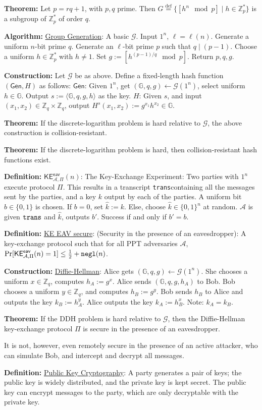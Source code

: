 \documentclass[10pt]{article}
\newcommand{\Z}{\mathbb{Z}}
\newcommand{\G}{\mathbb{G}}
\newcommand{\AAA}{\mathcal{A}}
\newcommand{\GGG}{\mathcal{G}}
\newcommand{\defn}[1]{{\bf Definition:} \underline{#1}}
\newcommand{\thm}[1]{{\bf Theorem:} \underline{#1}}
\newcommand{\con}[1]{{\bf Construction:} \underline{#1}}
\newcommand{\alg}[1]{{\bf Algorithm:} \underline{#1}}
\newcommand{\Gen}{\mathsf{Gen}}
\newcommand{\ang}[1]{\langle#1\rangle}
\newcommand{\ExptKEArgs}[2]{\mathsf{KE}^{\mathsf{eav}}_{#1,#2}}
\newcommand{\ExptKE}{\ExptKEArgs{\AAA}{\Pi}}
\newcommand{\negl}{{\tt negl}}
\newcommand{\trans}{{\tt trans}}
\newcommand{\from}{\leftarrow}
\begin{document}
\begin{multicols}{3}
\thm{}Let $p=rq+1$, with $p,q$ prime. Then $G\overset{\text{def}}{=}\{[h^n\mod{p}]\mid h\in\Z^*_p\}$ is a subgroup of $\Z^*_p$ of order $q$.

\alg{Group Generation}: A basic $\GGG$. Input $1^n$, $\ell=\ell(n)$. Generate a uniform $n$-bit prime $q$. Generate an $\ell$-bit prime $p$ such that $q\mid (p-1)$. Choose a uniform $h\in\Z_p^*$ with $h\neq 1$. Set $g:=[h^{(p-1)/q}\mod{p}]$. Return $p,q,g$.

\con{}Let $\GGG$ be as above. Define a fixed-length hash function $(\Gen,H)$ as follows: $\Gen$: Given $1^n$, get $(\G,q,g)\from\GGG(1^n)$, select uniform $h\in\G$. Output $s:=\ang{\G,q,g,h}$ as the key. $H$: Given $s$, and input $(x_1,x_2)\in\Z_q\times\Z_q$, output $H^s(x_1,x_2):=g^{x_1}h^{x_2}\in\G$.

\thm{}If the discrete-logarithm problem is hard relative to $\GGG$, the above construction is collision-resistant.

\thm{}If the discrete-logarithm problem is hard, then collision-resistant hash functions exist.

\defn{$\ExptKE(n)$}: The Key-Exchange Experiment: Two parties with $1^n$ execute protocol $\Pi$. This results in a transcript \trans containing all the messages sent by the parties, and a key $k$ output by each of the parties. A uniform bit $b\in\{0,1\}$ is chosen. If $b=0$, set $\hat{k}:=k$. Else, choose $\hat{k}\in\{0,1\}^n$ at random. $\AAA$ is given $\trans$ and $\hat{k}$, outputs $b'$. Success if and only if $b'=b$.

\defn{KE EAV secure}: (Security in the presence of an eavesdropper): A key-exchange protocol such that for all PPT adversaries $\AAA$, $\Pr[\ExptKE(n)=1]\leq\frac{1}{2}+\negl(n)$.

\con{Diffie-Hellman}: Alice gets $(\G,q,g)\from\GGG(1^n)$. She chooses a uniform $x\in\Z_q$, computes $h_A:=g^x$. Alice sends $(\G,q,g,h_A)$ to Bob. Bob chooses a uniform $y\in\Z_q$, and computes $h_B:=g^y$. Bob sends $h_B$ to Alice and outputs the key $k_B:=h^y_A$. Alice outputs the key $k_A:=h_B^x$. Note: $k_A=k_B$.

\thm{}If the DDH problem is hard relative to $\GGG$, then the Diffie-Hellman key-exchange protocol $\Pi$ is secure in the presence of an eavesdropper.

It is not, however, even remotely secure in the presence of an active attacker, who can simulate Bob, and intercept and decrypt all messages.

\defn{Public Key Cryptography}: A party generates a pair of keys; the public key is widely distributed, and the private key is kept secret. The public key can encrypt messages to the party, which are only decryptable with the private key.


\end{multicols}
\end{document}
